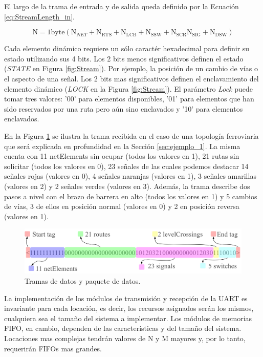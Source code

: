 	El largo de la trama de entrada y de salida queda definido por la Ecuación \ref{eq:StreamLength_in}.
	
	\begin{equation} 
		\label{eq:StreamLength_in}
		\text{N} = 1\text{byte} (\text{N}_{NET}+\text{N}_{\text{RTS}}+\text{N}_{\text{LCB}}+\text{N}_{\text{SSW}}+\text{N}_{\text{SCR}}\text{N}_{\text{SIG}}+\text{N}_{\text{DSW}})
	\end{equation}
	
	Cada elemento dinámico requiere un sólo caractér hexadecimal para definir su estado utilizando sus 4 bits. Los 2 bits menos significativos definen el estado (\textit{STATE} en Figura \ref{fig:Stream}). Por ejemplo, la posición de un cambio de vías o el aspecto de una señal. Los 2 bits mas significativos definen el enclavamiento del elemento dinámico (\textit{LOCK} en la Figura \ref{fig:Stream}). El parámetro \textit{Lock} puede tomar tres valores: '00' para elementos disponibles, '01' para elementos que han sido reservados por una ruta pero aún sino enclavados y '10' para elementos enclavados.
	
	En la Figura \ref{fig:Stream_ejemplo1} se ilustra la trama recibida en el caso de una topología ferroviaria que será explicada en profundidad en la Sección \ref{sec:ejemplo_1}. La misma cuenta con 11 netElements sin ocupar (todos los valores en 1), 21 rutas sin solicitar (todos los valores en 0), 23 señales de las cuales podemos destacar 14 señales rojas (valores en 0), 4 señales naranjas (valores en 1), 3 señales amarillas (valores en 2) y 2 señales verdes (valores en 3). Además, la trama describe dos pasos a nivel con el brazo de barrera en alto (todos los valores en 1) y 5 cambios de vías, 3 de ellos en posición normal (valores en 0) y 2 en posición reversa (valores en 1).	
	
	\begin{figure}[H]
		\centering
		\includegraphics[width=1\textwidth]{Figuras/Trama_ejemplo.jpg}
		\centering\caption{Tramas de datos y paquete de datos.}
		\label{fig:Stream_ejemplo1}
	\end{figure}

	La implementación de los módulos de transmisión y recepción de la UART es invariante para cada locación, es decir, los recursos asignados serán los mismos, cualquiera sea el tamaño del sistema a implementar. Los módulos de memorias FIFO, en cambio, dependen de las características y del tamaño del sistema. Locaciones mas complejas tendrán valores de N y M mayores y, por lo tanto, requerirán FIFOs mas grandes. 
	
